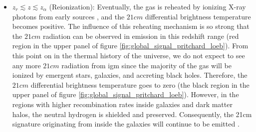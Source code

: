 \documentclass[12pt, TexShade, letterpaper]{report}
\begin{document}
\begin{itemize}
\item $z_r \lesssim z \lesssim z_\alpha$ (Reionization): Eventually, the gas is reheated by ionizing X-ray photons from early sources \cite{21century}, and the $21cm$ differential brightness temperature becomes positive. The influence of this reheating mechanism is so strong that the $21cm$ radiation can be observed in emission in this redshift range (red region in the upper panel of figure \ref{fig:global_signal_pritchard_loeb}). From this point on in the thermal history of the universe, we do not expect to see any more $21cm$ radiation from \gls{igm} since the majority of the gas will be ionized by emergent stars, galaxies, and accreting black holes. Therefore, the $21cm$ differential brightness temperature goes to zero (the black region in the upper panel of figure \ref{fig:global_signal_pritchard_loeb}). However, in the regions with higher recombination rates inside galaxies and dark matter halos, the neutral hydrogen is shielded and preserved. Consequently, the 21cm signature originating from inside the galaxies will continue to be emitted \cite{map_universe, 21century}.\par
\end{itemize}

\end{document}
